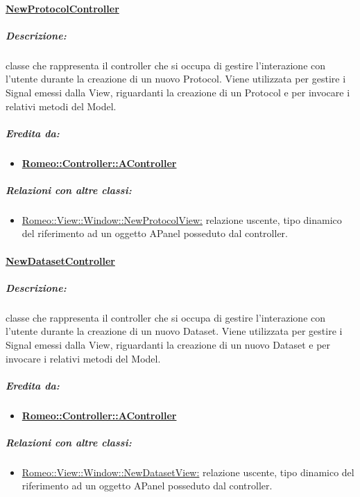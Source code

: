 	\paragraph{\underline{NewProtocolController}}
	\label{controller_np}
		\subparagraph{Descrizione:} classe che rappresenta il controller che si occupa di gestire l'interazione con l'utente durante la creazione di un nuovo Protocol\glossario{}. Viene utilizzata per gestire i Signal emessi dalla View, riguardanti la creazione di un Protocol\glossario{} e per invocare i relativi metodi del Model.
		\subparagraph{Eredita da:}
			\begin{itemize}
				\item \textbf{\hyperref[controller_a]{Romeo::Controller::AController}}
			\end{itemize}
		\subparagraph{Relazioni con altre classi:}
			\begin{itemize}
				\item \hyperref[npv]{Romeo::View::Window::NewProtocolView:} relazione uscente, tipo dinamico del riferimento ad un oggetto APanel posseduto dal controller.
			\end{itemize}
		
		
		
	\paragraph{\underline{NewDatasetController}}
	\label{controller_nd}
		\subparagraph{Descrizione:} classe che rappresenta il controller che si occupa di gestire l'interazione con l'utente durante la creazione di un nuovo Dataset\glossario{}. Viene utilizzata per gestire i Signal emessi dalla View, riguardanti la creazione di un nuovo Dataset\glossario{} e per invocare i relativi metodi del Model.
		\subparagraph{Eredita da:}
			\begin{itemize}
				\item \textbf{\hyperref[controller_a]{Romeo::Controller::AController}}
			\end{itemize}
		\subparagraph{Relazioni con altre classi:}
			\begin{itemize}
				\item \hyperref[ndv]{Romeo::View::Window::NewDatasetView:} relazione uscente, tipo dinamico del riferimento ad un oggetto APanel posseduto dal controller.
			\end{itemize}
		
